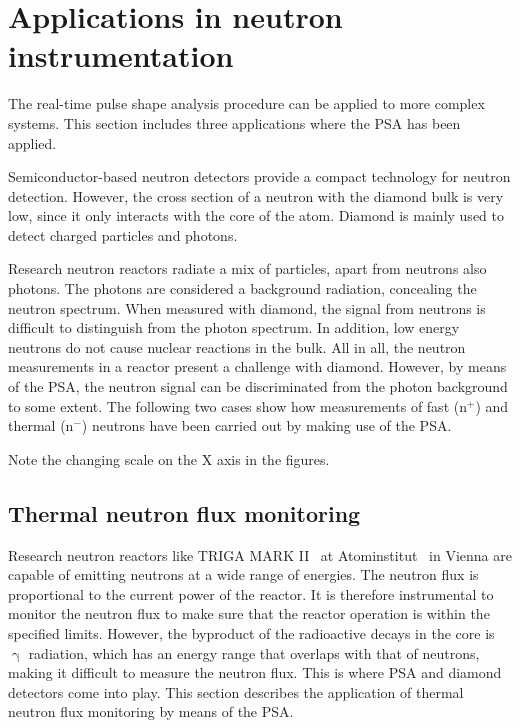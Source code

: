 \section{Applications in neutron instrumentation}
\label{sec:nm}

The real-time pulse shape analysis procedure can be applied to more complex systems. This section includes three applications where the PSA has been applied.

Semiconductor-based neutron detectors provide a compact technology for neutron detection. However, the cross section of a neutron with the diamond bulk is very low, since it only interacts with the core of the atom. Diamond is mainly used to detect charged particles and photons. 

Research neutron reactors radiate a mix of particles, apart from neutrons also photons. The photons are considered a background radiation, concealing the neutron spectrum. When measured with diamond, the signal from neutrons is difficult to distinguish from the photon spectrum. In addition, low energy neutrons do not cause nuclear reactions in the bulk. All in all, the neutron measurements in a reactor present a challenge with diamond. However, by means of the PSA, the neutron signal can be discriminated from the photon background to some extent. The following two cases show how measurements of fast (n$^+$) and thermal (n$^-$) neutrons have been carried out by making use of the PSA.

Note the changing scale on the X axis in the figures.


\subsection{Thermal neutron flux monitoring}
Research neutron reactors like TRIGA MARK II~\cite{TRIGA:00001} at Atominstitut~\cite{ATOM:00001} in Vienna are capable of emitting neutrons at a wide range of energies. The neutron flux is proportional to the current power of the reactor. It is therefore instrumental to monitor the neutron flux to make sure that the reactor operation is within the specified limits. However, the byproduct of the radioactive decays in the core is $\upgamma$ radiation, which has an energy range that overlaps with that of neutrons, making it difficult to measure the neutron flux. This is where PSA and diamond detectors come into play. This section describes the application of thermal neutron flux monitoring by means of the PSA.

